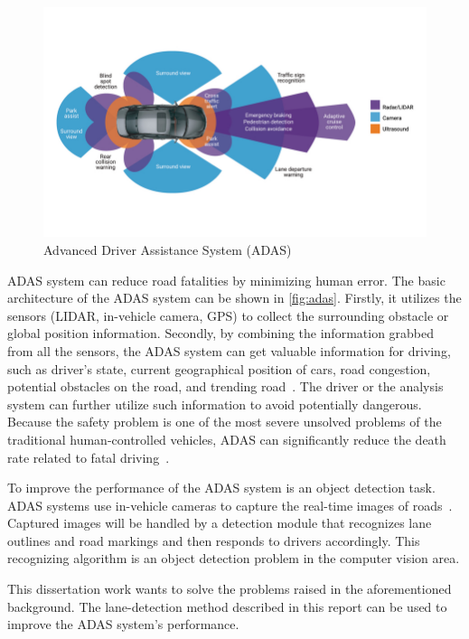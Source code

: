 \begin{spacing}{1.5}
\begin{figure}[ht]
\centering
\includegraphics[width=5.5in, fbox]{Chapter1/adas.jpg}
\caption{Advanced Driver Assistance System (ADAS)~\cite{adas}}
\label{fig:adas} 
\end{figure}

ADAS system can reduce road fatalities by minimizing human error. The basic architecture of the ADAS system can be shown in \autoref{fig:adas}. Firstly, it utilizes the sensors (LIDAR, in-vehicle camera, GPS) to collect the surrounding obstacle or global position information. Secondly, by combining the information grabbed from all the sensors, the ADAS system can get valuable information for driving, such as driver's state, current geographical position of cars, road congestion, potential obstacles on the road, and trending road~\cite{morignot2014arbitration}. The driver or the analysis system can further utilize such information to avoid potentially dangerous. Because the safety problem is one of the most severe unsolved problems of the traditional human-controlled vehicles, ADAS can significantly reduce the death rate related to fatal driving~\cite{brookhuis2001behavioural}.

To improve the performance of the ADAS system is an object detection task. ADAS systems use in-vehicle cameras to capture the real-time images of roads~\cite{ziebinski2016survey}. Captured images will be handled by a detection module that recognizes lane outlines and road markings and then responds to drivers accordingly. This recognizing algorithm is an object detection problem in the computer vision area. 

This dissertation work wants to solve the problems raised in the aforementioned background. The lane-detection method described in this report can be used to improve the ADAS system's performance. 


\end{spacing}
